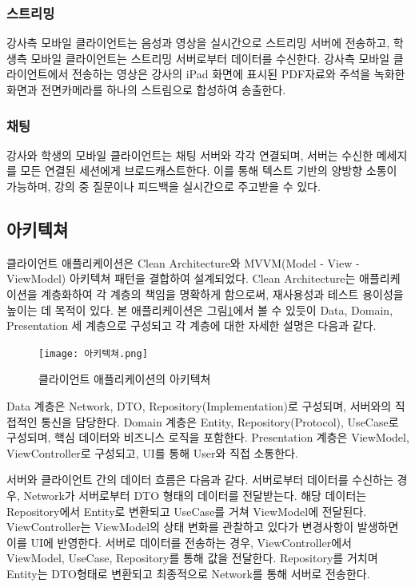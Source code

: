 \documentclass[10pt, a4paper, oneside]{article}
\begin{document}
\subsubsection{스트리밍}
강사측 모바일 클라이언트는 음성과 영상을 실시간으로 스트리밍 서버에 전송하고, 학생측 모바일 클라이언트는 스트리밍 서버로부터 데이터를 수신한다. 강사측 모바일 클라이언트에서 전송하는 영상은 강사의 iPad 화면에 표시된 PDF자료와 주석을 녹화한 화면과 전면카메라를 하나의 스트림으로 합성하여 송출한다.
\subsubsection{채팅}
강사와 학생의 모바일 클라이언트는 채팅 서버와 각각 연결되며, 서버는 수신한 메세지를 모든 연결된 세션에게 브로드캐스트한다. 이를 통해 텍스트 기반의 양방향 소통이 가능하며, 강의 중 질문이나 피드백을 실시간으로 주고받을 수 있다.
\subsection{아키텍쳐}
클라이언트 애플리케이션은 Clean Architecture와 MVVM(Model - View - ViewModel) 아키텍쳐 패턴을 결합하여 설계되었다. Clean Architecture는 애플리케이션을 계층화하여 각 계층의 책임을 명확하게 함으로써, 재사용성과 테스트 용이성을 높이는 데 목적이 있다. 본 애플리케이션은 그림\ref{fig:fig2}에서 볼 수 있듯이 Data, Domain, Presentation 세 계층으로 구성되고 각 계층에 대한 자세한 설명은 다음과 같다.
\begin{figure}[htbp]
    \begin{center}
    \texttt{[image: 아키텍쳐.png]}
    \caption{클라이언트 애플리케이션의 아키텍쳐}
    \label{fig:fig2}
    \end{center}
\end{figure}

Data 계층은 Network, DTO, Repository(Implementation)로 구성되며, 서버와의 직접적인 통신을 담당한다. Domain 계층은 Entity, Repository(Protocol), UseCase로 구성되며, 핵심 데이터와 비즈니스 로직을 포함한다. Presentation 계층은 ViewModel, ViewController로 구성되고, UI를 통해 User와 직접 소통한다.

서버와 클라이언트 간의 데이터 흐름은 다음과 같다.
서버로부터 데이터를 수신하는 경우, Network가 서버로부터 DTO 형태의 데이터를 전달받는다. 해당 데이터는 Repository에서 Entity로 변환되고 UseCase를 거쳐 ViewModel에 전달된다. ViewController는 ViewModel의 상태 변화를 관찰하고 있다가 변경사항이 발생하면 이를 UI에 반영한다.
서버로 데이터를 전송하는 경우, ViewController에서 ViewModel, UseCase, Repository를 통해 값을 전달한다. Repository를 거치며 Entity는 DTO형태로 변환되고 최종적으로 Network를 통해 서버로 전송한다.
\newpage
\end{document}
